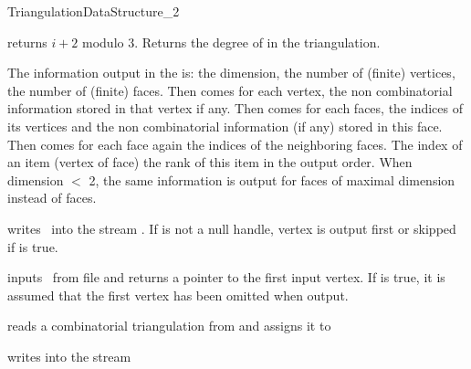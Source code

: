 \begin{ccRefConcept}{TriangulationDataStructure_2}

\ccGlue
{}
{returns $i+2$ modulo 3.}
\ccGlue
{}
\ccGlue
{}
{Returns the degree of  in the triangulation.}


The information output  in the  is: 
the dimension, the number of (finite) vertices, 
the number of (finite) faces.
Then comes 
for each vertex, the non combinatorial information stored in  that vertex
if any.
Then comes 
for each faces,  the indices of its vertices and 
the non combinatorial information (if any) stored in  this face.
Then comes 
for each face again 
 the indices of the neighboring faces. 
The  index of an item  (vertex of face)
the rank of this item in the output order.
When dimension $<$ 2, the same information is output
for faces of maximal dimension instead of faces.


{writes \ccVar\ into the stream . 
If  is not a null handle, vertex 
is output first or skipped if  is true.}

{inputs \ccVar\ from file and returns a pointer to the first input vertex.
  If  is true, it is assumed that the first
   vertex has been omitted when output.}

{reads a combinatorial triangulation from  and assigns it to }

{writes  into the stream }




\ccHasModels
{} \\

\ccSeeAlso
{} \\
 \\

\end{ccRefConcept}


